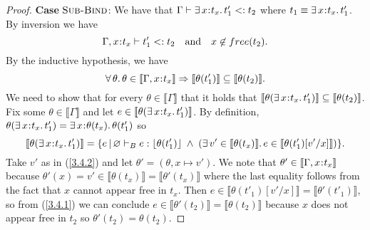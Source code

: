 \documentclass[11pt]{article}
\newcommand{\bind}{\hspace{0.05em}{:}\hspace{0.05em}} %
\newcommand{\lb}{\llbracket}         %
\newcommand{\rb}{\rrbracket}         %
\newcommand{\existype}[3]{\exists\, #1\bind #2.\, #3}
\begin{document}
\begin{proof}
{\bf Case} $\textsc{Sub-Bind}$: We have that $\Gamma \vdash \exists\, x\bind t_x.\, t'_1 <: t_2$ where $t_1 \equiv \exists\, x\bind t_x.\, t'_1$. By inversion we have
\[
\Gamma, x\bind t_x\vdash t'_1 <: t_2 \quad {\rm and}\quad x \not\in free(t_2).
\]
By the inductive hypothesis, we have
\begin{equation}
\forall\,\theta.\, \theta\in\lb\Gamma,x\bind t_x\rb \Rightarrow \lb\theta(t'_1)\rb \subseteq \lb\theta(t_2)\rb.
\label{3.4.1}	
\end{equation}
We need to show that for every $\theta \in \lb\Gamma\rb$ that it holds that $\lb \theta(\exists\, x\bind t_x.\, t'_1)\rb \subseteq \lb\theta(t_2)\rb$. Fix some $\theta \in \lb\Gamma\rb$ and let $e \in \lb \theta(\exists\, x\bind t_x.\, t'_1)\rb$. By definition, $\theta(\exists\, x\bind t_x.\, t'_1) = \exists\, x\bind \theta(t_x).\, \theta(t'_1)$ so
\begin{equation}\label{3.4.2}
\lb \theta(\existype{x}{t_x}{t'_1})\rb = \{ e \,|\, \varnothing \vdash_B e: \lfloor\theta(t'_1)\rfloor \;\wedge\; (\exists\,v' \in \lb\theta(t_x)\rb.\, e \in \lb\theta(t'_1)[v'/x]\rb)\}.
\end{equation}
Take $v'$ as in (\ref{3.4.2}) and let $\theta' = (\theta, x\mapsto v')$. We note that $\theta' \in \lb\Gamma,x\bind t_x\rb$ because $\theta'(x) = v' \in \lb\theta(t_x)\rb = \lb\theta'(t_x)\rb$ where the last equality follows from the fact that $x$ cannot appear free in $t_x$. Then $e \in \lb\theta(t'_1)[v'/x]\rb =  \lb\theta'(t'_1)\rb$, so from (\ref{3.4.1}) we can conclude $e \in \lb\theta'(t_2)\rb = \lb\theta(t_2)\rb$ because $x$ does not appear free in $t_2$ so $\theta'(t_2)=\theta(t_2)$. 


\end{proof}
\end{document}
